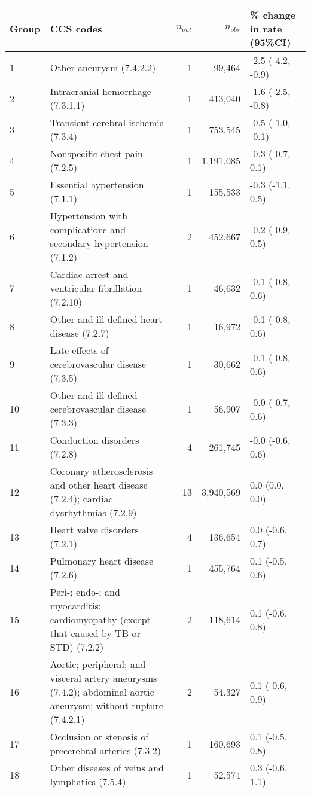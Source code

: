 \begin{tabular}{lp{6.5cm}rrp{2.2cm}}
  \hline
Group & CCS codes & $n_{out}$ & $n_{obs}$ & \% change in rate (95\%CI) \\ 
  \hline
 1 & Other aneurysm (7.4.2.2) &  1 & 99,464 & -2.5 (-4.2, -0.9) \\ 
   2 & Intracranial hemorrhage (7.3.1.1) &  1 & 413,040 & -1.6 (-2.5, -0.8) \\ 
   3 & Transient cerebral ischemia (7.3.4) &  1 & 753,545 & -0.5 (-1.0, -0.1) \\ 
   4 & Nonspecific chest pain (7.2.5) &  1 & 1,191,085 & -0.3 (-0.7, 0.1) \\ 
   5 & Essential hypertension (7.1.1) &  1 & 155,533 & -0.3 (-1.1, 0.5) \\ 
   6 & Hypertension with complications and secondary hypertension (7.1.2) &  2 & 452,667 & -0.2 (-0.9, 0.5) \\ 
   7 & Cardiac arrest and ventricular fibrillation (7.2.10) &  1 & 46,632 & -0.1 (-0.8, 0.6) \\ 
   8 & Other and ill-defined heart disease (7.2.7) &  1 & 16,972 & -0.1 (-0.8, 0.6) \\ 
   9 & Late effects of cerebrovascular disease (7.3.5) &  1 & 30,662 & -0.1 (-0.8, 0.6) \\ 
  10 & Other and ill-defined cerebrovascular disease (7.3.3) &  1 & 56,907 & -0.0 (-0.7, 0.6) \\ 
  11 & Conduction disorders (7.2.8) &  4 & 261,745 & -0.0 (-0.6, 0.6) \\ 
  12 & Coronary atherosclerosis and other heart disease (7.2.4); cardiac dysrhythmias (7.2.9) & 13 & 3,940,569 & 0.0 (0.0, 0.0) \\ 
  13 & Heart valve disorders (7.2.1) &  4 & 136,654 & 0.0 (-0.6, 0.7) \\ 
  14 & Pulmonary heart disease (7.2.6) &  1 & 455,764 & 0.1 (-0.5, 0.6) \\ 
  15 & Peri-; endo-; and myocarditis; cardiomyopathy (except that caused by TB or STD) (7.2.2) &  2 & 118,614 & 0.1 (-0.6, 0.8) \\ 
  16 & Aortic; peripheral; and visceral artery aneurysms (7.4.2); abdominal aortic aneurysm; without rupture (7.4.2.1) &  2 & 54,327 & 0.1 (-0.6, 0.9) \\ 
  17 & Occlusion or stenosis of precerebral arteries (7.3.2) &  1 & 160,693 & 0.1 (-0.5, 0.8) \\ 
  18 & Other diseases of veins and lymphatics (7.5.4) &  1 & 52,574 & 0.3 (-0.6, 1.1) \\ 

\end{tabular}
